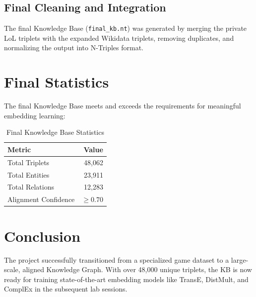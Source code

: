 \documentclass[11pt,a4paper]{article}
\begin{document}
\subsection{Final Cleaning and Integration}
The final Knowledge Base (\texttt{final\_kb.nt}) was generated by merging the private LoL triplets with the expanded Wikidata triplets, removing duplicates, and normalizing the output into N-Triples format.

\section{Final Statistics}
The final Knowledge Base meets and exceeds the requirements for meaningful embedding learning:
\begin{table}[h]
\centering
\begin{tabular}{lr}
\toprule
Metric & Value \\
\midrule
Total Triplets & 48,062 \\
Total Entities & 23,911 \\
Total Relations & 12,283 \\
Alignment Confidence & $\geq 0.70$ \\
\bottomrule
\end{tabular}
\caption{Final Knowledge Base Statistics}
\end{table}

\section{Conclusion}
The project successfully transitioned from a specialized game dataset to a large-scale, aligned Knowledge Graph. With over 48,000 unique triplets, the KB is now ready for training state-of-the-art embedding models like TransE, DistMult, and ComplEx in the subsequent lab sessions.
\end{document}
